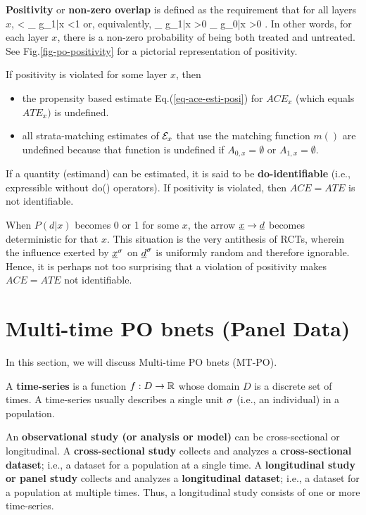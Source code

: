 {\bf Positivity}
or {\bf
non-zero overlap} is defined as the
requirement that for all layers $x$,
<
_{
g_{1|x}}
<1
\eeq
or, equivalently,
\beq
{}_
{g_{1|x}}
>0
_
{g_{0|x}}
>0
\;.
\eeq
In other words,
for each layer $x$,
there is
a non-zero
probability of being both treated
and untreated.
See Fig.\ref{fig-po-positivity} for a pictorial
representation of positivity.

If positivity is violated
for some layer $x$, then
\begin{itemize}
\item
the propensity based estimate
Eq.(\ref{eq-ace-esti-posi}) for
 $ACE_x$
(which equals ${ATE}_x)$
is undefined.
\item
all strata-matching estimates of
${\cal E}_x$
that use the matching function
$m()$
are undefined
because that function
is undefined if $A_{0,x}=\emptyset$
or $A_{1,x}=\emptyset$.
\end{itemize}
If a quantity (estimand)
 can be estimated,
it is said to be {\bf do-identifiable}
 (i.e., expressible without do() operators).
If positivity is violated,
 then
 $ACE=ATE$ is not identifiable.



When
$P(d|x)$
becomes 0 or 1 for some $x$,
the arrow
$\rvx\rarrow\rvd$
becomes deterministic
for that $x$.
This situation
is
the very
antithesis
of RCTs,
wherein
the influence
exerted by $\rvx^\s$ on
$\rvd^\s$ is uniformly
random and therefore ignorable.
Hence, it is perhaps
not too surprising
that a violation
of positivity makes
$ACE=ATE$
not identifiable.



\section{Multi-time PO bnets (Panel Data)}

In this section, we will
discuss Multi-time PO bnets (MT-PO).

A {\bf time-series} is a function $f:D\rightarrow { \mathbb{R}}$
whose domain $D$ is a discrete set
of times. A time-series
usually describes a single
unit $\sigma$ (i.e., an individual)
in a population.

An {\bf observational study (or analysis or model)}
can be cross-sectional or longitudinal.
A {\bf cross-sectional study}
collects and analyzes a {\bf cross-sectional dataset};
i.e., a dataset for a population
at a single time. A {\bf longitudinal study
or panel study} collects and analyzes
a {\bf longitudinal dataset};
i.e., a dataset for a population
at  multiple times.
Thus, a longitudinal study
consists of one or more time-series.

